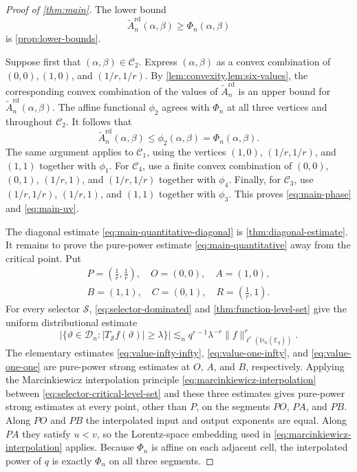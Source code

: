\documentclass[11pt,letterpaper]{amsart}
\numberwithin{equation}{section}
\theoremstyle{definition}
\theoremstyle{remark}
\newcommand{\Fq}{\mathbb F_q}
\newcommand{\HH}{\mathbb H}
\newcommand{\Dn}{\mathcal D_n}
\newcommand{\norm}[1]{\lVert #1\rVert}
\begin{document}
\begin{proof}[Proof of \cref{thm:main}]
The lower bound
\[
 \widetilde A_n^{\mathrm{rd}}(\alpha,\beta)\geq\Phi_n(\alpha,\beta)
\]
is \cref{prop:lower-bounds}.

Suppose first that $(\alpha,\beta)\in\mathcal C_2$. Express
$(\alpha,\beta)$ as a convex combination of $(0,0),(1,0)$, and $(1/r,1/r)$. By \cref{lem:convexity,lem:six-values}, the corresponding convex combination of the values of $\widetilde A_n^{\mathrm{rd}}$ is an upper bound for $\widetilde A_n^{\mathrm{rd}}(\alpha,\beta)$. The affine functional $\phi_2$ agrees with $\Phi_n$ at all three vertices and throughout $\mathcal C_2$. It follows that
\[
 \widetilde A_n^{\mathrm{rd}}(\alpha,\beta)
 \leq \phi_2(\alpha,\beta)=\Phi_n(\alpha,\beta).
\]
The same argument applies to $\mathcal C_1$, using the vertices
$(1,0)$, $(1/r,1/r)$, and $(1,1)$ together with $\phi_1$.  For
$\mathcal C_4$, use a finite convex combination of $(0,0)$, $(0,1)$, $(1/r,1)$, and $(1/r,1/r)$ together with $\phi_4$.  Finally, for $\mathcal C_3$, use $(1/r,1/r)$, $(1/r,1)$, and $(1,1)$ together with $\phi_3$. This proves \eqref{eq:main-phase} and \eqref{eq:main-uv}.

The diagonal estimate \eqref{eq:main-quantitative-diagonal} is
\cref{thm:diagonal-estimate}. It remains to prove the pure-power estimate \eqref{eq:main-quantitative} away from the critical point.  Put
\[
 \begin{gathered}
 P=\left(\frac1r,\frac1r\right),\quad
 O=(0,0),\quad A=(1,0),\\
 B=(1,1),\quad C=(0,1),\quad
 R=\left(\frac1r,1\right).
 \end{gathered}
\]
For every selector $\mathcal S$, \eqref{eq:selector-dominated} and
\cref{thm:function-level-set} give the uniform distributional estimate
\begin{equation}\label{eq:selector-critical-level-set}
 \bigl|\{\vartheta\in\Dn:
       |T_{\mathcal S}f(\vartheta)|\geq\lambda\}\bigr|
 \lesssim_n
 q^{r-1}\lambda^{-r}
 \norm{f}_{\ell^r(\HH_n(\Fq))}^r.
\end{equation}
The elementary estimates \eqref{eq:value-infty-infty}, \eqref{eq:value-one-infty}, and \eqref{eq:value-one-one} are pure-power strong estimates at $O$, $A$, and $B$, respectively.  Applying the Marcinkiewicz interpolation principle \eqref{eq:marcinkiewicz-interpolation} between \eqref{eq:selector-critical-level-set} and these three estimates gives pure-power strong estimates at every point, other than $P$, on the segments $PO$, $PA$, and $PB$. Along $PO$ and $PB$ the interpolated input and output exponents are equal. Along $PA$ they satisfy $u<v$, so the Lorentz-space embedding used in \eqref{eq:marcinkiewicz-interpolation} applies. Because
$\Phi_n$ is affine on each adjacent cell, the interpolated power of $q$ is exactly $\Phi_n$ on all three segments.


\end{proof}
\end{document}
